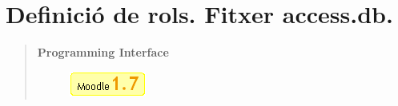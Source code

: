 \documentclass[a4paper]{report}  %
\begin{document}
\section{Definició de rols. Fitxer access.db.}\label{annexrols}
\begin{otherlanguage}{english}
\begin{quote}
\begin{minipage}{10cm}
{\bfseries Programming Interface}
\end{minipage}
\hfill
\begin{minipage}{2.51cm}
		\begin{figure}[H] %
		\begin{center}
		\includegraphics[width=2.51cm]{img/Moodle17.png}
		\label{fig:Moodle17}
		\end{center}
		\end{figure}


\end{minipage}
\end{quote}
\end{otherlanguage}
\end{document}
